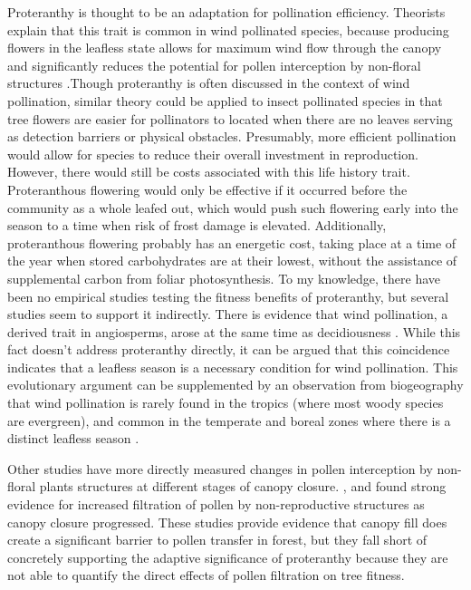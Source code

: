 \documentclass{article}\usepackage[]{graphicx}\usepackage[]{color}
\begin{document}
\par Proteranthy is thought to be an adaptation for pollination efficiency. Theorists explain that this trait is common in wind pollinated species, because producing flowers in the leafless state allows for maximum wind flow through the canopy and significantly reduces the potential for pollen interception by non-floral structures \citep{Rathcke1985, Whitehead1969}.Though proteranthy is often discussed in the context of wind pollination, similar theory could be applied to insect pollinated species in that tree flowers are easier for pollinators to located when there are no leaves serving as detection barriers or physical obstacles. Presumably, more efficient pollination would allow for species to reduce their overall investment in reproduction. However, there would still be costs associated with this life history trait. Proteranthous flowering would only be effective if it occurred before the community as a whole leafed out, which would push such flowering early into the season to a time when risk of frost damage is elevated. Additionally, proteranthous flowering probably has an energetic cost, taking place at a time of the year when stored carbohydrates are at their lowest, without the assistance of supplemental carbon from foliar photosynthesis\citep{Aschan2003}.
To my knowledge, there have been no empirical studies testing the fitness benefits of proteranthy, but several studies seem to support it indirectly. There is evidence that wind pollination, a derived trait in angiosperms, arose at the same time as decidiousness \citep{Whitehead1969}. While this fact doesn't address proteranthy directly, it can be argued that this coincidence indicates that a leafless season is a necessary condition for wind pollination. This evolutionary argument can be supplemented by an observation from biogeography that wind pollination is rarely found in the tropics (where most woody species are evergreen), and common in the temperate and boreal zones where there is a distinct leafless season \citep{Whitehead1969}.
\par Other studies have more directly measured changes in pollen interception by non-floral plants structures at different stages of canopy closure. \citep {Tauber1967, Milleron2012}, and found strong evidence for increased filtration of pollen by non-reproductive structures as canopy closure progressed. These studies provide evidence that canopy fill does create a significant barrier to pollen transfer in forest, but they fall short of concretely supporting the adaptive significance of proteranthy because they are not able to quantify the direct effects of pollen filtration on tree fitness.
\end{document}
